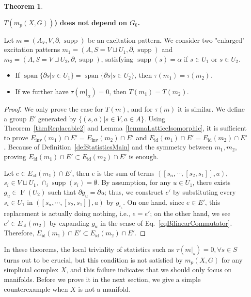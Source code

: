 \documentclass[reprint, amsmath, amssymb, showpacs, floatfix, longbibliography, aps, twocolumn, superscriptaddress, nofootinbib]{revtex4-2}
\newcommand{\supp}{\operatorname{supp}}
\theoremstyle{definition}
\newtheorem{theorem}{Theorem}[section]
\begin{document}
\begin{theorem}\label{thmG0independence}
	
	\textbf{$T(m_p(X,G))$) does not depend on $G_0$.}
	
	 Let $m=(A_V,V,\partial,\supp)$ be an excitation pattern. We consider two "enlarged" excitation patterns $m_1=(A,S=V\sqcup U_1,\partial,\supp)$ and $m_2=(A,S=V\sqcup U_2,\partial,\supp)$, satisfying $\supp(s)=\alpha$ if $s\in U_1$ or $s\in U_2$.
	 \begin{itemize}
	 	\item If $\operatorname{span}\{\partial s|s\in U_1\}=\operatorname{span}\{\partial s|s\in U_2\}$, then $\tau(m_1)=\tau(m_2)$.
	 	\item If we further have $\tau(m|_\alpha)=0$, then $T(m_1)=T(m_2)$.
	 \end{itemize}

\end{theorem}
\begin{proof}
	We only prove the case for $T(m)$, and for $\tau(m)$ it is similar. We define a group $E'$ generated by $\{(s,a)|s\in V,a\in A\}$. Using Theorem~\ref{thmReplacable2} and Lemma~\ref{lemmaLatticeIsomorphic}, it is sufficient to prove $E_{\operatorname{inv}}(m_1)\cap E'=E_{\operatorname{inv}}(m_2)\cap E'$ and $E_{\operatorname{id}}(m_1)\cap E'=E_{\operatorname{id}}(m_2)\cap E'$. Because of Definition~\ref{defStatisticsMain} and the symmetry between $m_1,m_2$, proving $E_{\operatorname{id}}(m_1)\cap E'\subset E_{\operatorname{id}}(m_2)\cap E'$ is enough. 
	
	Let $e\in E_{\operatorname{id}}(m_1)\cap E'$, then $e$ is the sum of terms $([s_n,\cdots,[s_2,s_1]],a)$, $s_i\in V\sqcup U_1$, $\cap_i\supp(s_i)=\emptyset$. By assumption, for any $u\in U_1$, there exists $g_u\in \operatorname{F}(U_2)$ such that $\partial g_u=\partial u$; thus, we construct $e'$ by substituting every $s_i\in U_1$ in $([s_n,\cdots,[s_2,s_1]],a)$ by $g_{s_i}$. On one hand, since $e\in E'$, this replacement is actually doing nothing, i.e., $e=e'$;
	on the other hand, we see $e'\in E_{\operatorname{id}}(m_2)$ by expanding $g_u$ in the sense of Eq.~\eqref{eqBilinearCommutator}. Therefore, $E_{\operatorname{id}}(m_1)\cap E'\subset E_{\operatorname{id}}(m_2)\cap E'$.

\end{proof}


	In these theorems, the local triviality of statistics such as $\tau(m|_s)=0,\forall s\in S$ turns out to be crucial, but this condition is not satisfied by $m_p(X,G)$ for any simplicial complex $X$, and this failure indicates that we should only focus on manifolds. Before we prove it in the next section, we give a simple counterexample when $X$ is not a manifold.
\end{document}
